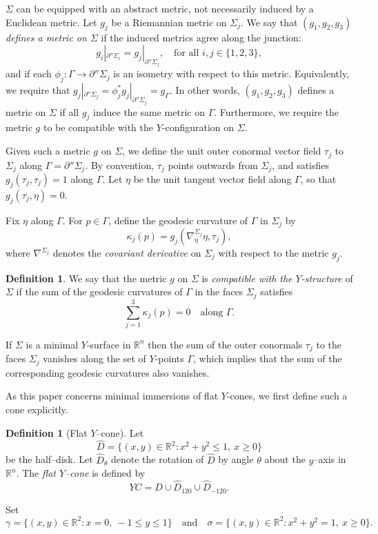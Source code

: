 \documentclass[11pt]{amsart}
\numberwithin{equation}{section}
\theoremstyle{theorem}
\theoremstyle{definition}
\newtheorem{definition}[theorem]{Definition}
\numberwithin{equation}{section}
\begin{document}
$\Sigma$ can be equipped with an abstract metric, not
necessarily induced by a Euclidean metric. Let $g_j$ be a Riemannian metric on $\Sigma_j$. 
We say that \emph{$(g_1,g_2,g_3)$ defines a metric on $\Sigma$} if the induced metrics agree along the junction:
\[
g_i|_{\partial'' \Sigma_i} = g_j|_{\partial'' \Sigma_j}, \quad \text{for all } i,j\in \{1,2,3\},
\]
and if each $\phi_j : \Gamma \rightarrow \partial'' \Sigma_j$ is an isometry with respect to this metric. 
Equivalently, we require that $g_j|_{\partial'' \Sigma_j} = \phi_j^* g_j|_{\partial'' \Sigma_j} = g_{\Gamma}$. 
In other words, $(g_1,g_2,g_3)$ defines a metric on $\Sigma$ if all $g_j$ induce the same metric on $\Gamma$. 
Furthermore, we require the metric $g$ to be compatible with the $Y$-configuration on $\Sigma$.
\medskip

Given such a metric $g$ on $\Sigma$, we define the unit outer conormal vector field $\tau_j$ to $\Sigma_j$ along $\Gamma = \partial'' \Sigma_j$. 
By convention, $\tau_j$ points outwards from $\Sigma_j$, and satisfies $g_j(\tau_j ,\tau_j)=1$ along $\Gamma$. 
Let $\eta$ be the unit tangent vector field along $\Gamma$, so that $g_j(\tau_j ,\eta )=0$. 
\medskip

Fix $\eta$ along $\Gamma$. For $p\in \Gamma$, define the geodesic curvature of $\Gamma$ in $\Sigma_j$ by
\[
\kappa_j(p)=g_j(\nabla_{\eta}^{\Sigma_j} \eta ,\tau_j ),
\]
where $\nabla^{\Sigma_j}$ denotes the \emph{covariant derivative} on $\Sigma_j$ with respect to the metric $g_j$.

\begin{definition}
We say that the metric $g$ on $\Sigma$ is \emph{compatible with the $Y$-structure} of $\Sigma$ if the sum of the geodesic curvatures of $\Gamma$ in the faces $\Sigma_j$ satisfies
\[
\sum_{j=1}^{3} \kappa_j(p) = 0 \quad \text{along } \Gamma.
\]
\end{definition}

If $\Sigma$ is a minimal $Y$-surface in $\mathbb{R}^n$ then the sum of the outer conormals $\tau_j$ to the faces $\Sigma_j$ vanishes along the set of $Y$-points $\Gamma$, which implies that the sum of the corresponding geodesic curvatures also vanishes.
\medskip


As this paper concerns minimal immersions of flat $Y$-cones, we first define such a cone explicitly. 
\begin{definition}[Flat $Y$–cone]\label{def:Ycone}
Let
\[
\hat D=\{(x,y)\in\mathbb{R}^2: x^2+y^2\le1,\ x\ge0\}
\]
be the half–disk. Let $\hat D_\theta$ denote the rotation of $\hat D$ by angle $\theta$ about the $y$–axis in $\mathbb{R}^n$.
The \emph{flat $Y$–cone} is defined by
\[
YC=\hat D\cup\hat D_{120}\cup\hat D_{-120}.
\]
\end{definition}
Set
\[
\gamma = \{ (x,y) \in \mathbb{R}^2 : x=0,\ -1 \leq y \leq 1 \}
\quad \text{and} \quad 
\sigma = \{ (x,y) \in \mathbb{R}^2 : x^2 + y^2 = 1,\ x \geq 0 \}.
\]
\end{document}
